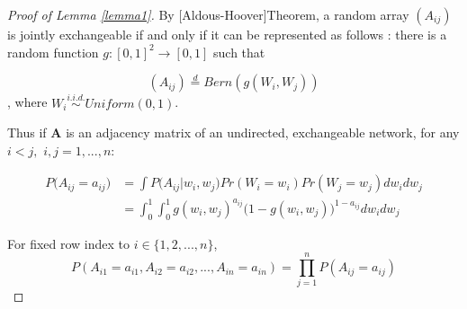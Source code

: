 \documentclass[12pt]{article}
\theoremstyle{definition}
\begin{document}
\begin{proof}[Proof of Lemma \ref{lemma1}]
By [Aldous-Hoover]Theorem, a random array $(A_{ij})$ is jointly exchangeable if and only if it can be represented as follows : there is a random function $g : [0,1]^2 \rightarrow [0,1]$ such that 

$$(A_{ij})  \stackrel{d}{=} Bern( g(W_{i}, W_{j}))$$
, where $W_{i} \overset{i.i.d.}{\sim} Uniform(0,1)$. 

Thus if $\mathbf{A}$ is an adjacency matrix of an undirected, exchangeable network, for any $i < j,$ $i,j = 1,... , n$:


\begin{equation}
\begin{split}
P \big(  A_{ij} = a_{ij} \big) & = \int P \big( A_{ij} \big| w_{i}, w_{j} \big) Pr(W_{i} = w_{i}) Pr(W_{j} = w_{j}) dw_{i} dw_{j} \\ & = \int_{0}^{1} \int_{0}^{1} g( w_{i},  w_{j})^{a_{ij}} \big( 1- g( w_{i},  w_{j}) \big)^{1-a_{ij}} dw_{i} dw_{j} 
\end{split}
\end{equation}

For fixed row index to $i \in \{1,2,... , n\}$,
$$P(A_{i1} = a_{i1}, A_{i2} = a_{i2}, ... , A_{in} = a_{in} ) = \prod\limits_{j=1}^{n} P(A_{ij} = a_{ij})$$

\end{proof}
\end{document}
